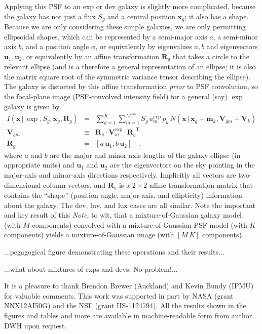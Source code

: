 \documentclass[12pt,pdftex,preprint]{aastex}
\newcommand{\documentname}{\textsl{Note}}
\newcommand{\tmatrix}[1]{\boldsymbol{#1}}
\newcommand{\transpose}[1]{{#1}^{\mathsf T}}
\newcommand{\tvector}[1]{\boldsymbol{#1}}
\newcommand{\pos}{\tvector{x}}
\newcommand{\mean}{\tvector{m}}
\newcommand{\var}{\tmatrix{V}}
\newcommand{\affine}{\tmatrix{R}}
\newcommand{\uv}{\tvector{u}}
\newcommand{\normal}{N}
\newcommand{\given}{\,|\,}
\newcommand{\dev}{\mathrm{dev}}
\newcommand{\lux}{\mathrm{lux}}
\newcommand{\luv}{\mathrm{luv}}
\begin{document}
Applying this PSF to an exp or dev galaxy is slightly more
complicated, because the galaxy has not just a flux $S_g$ and a
central position $\pos_g$; it also has a shape.  Because we are only
considering these simple galaxies, we are only permitting ellipsoidal
shapes, which can be represented by a semi-major axis $a$, a
semi-minor axis $b$, and a position angle $\phi$, or equivalently by
eigenvalues $a, b$ and eigenvectors $\uv_1, \uv_2$, or equivalently by
an affine transformation $\affine_g$ that takes a circle to the
relevant ellipse (and is a therefore a general representation of an
ellipse; it is also the matrix square root of the symmetric variance
tensor describing the ellipse).  The galaxy is distorted by this
affine transformation \emph{prior} to PSF convolution, so the
focal-plane image (PSF-convolved intensity field) for a general (say)
$\exp$ galaxy is given by
\begin{eqnarray}\displaystyle
I(\pos\given\exp,S_g,\pos_g,\affine_g) &=& \sum_{k=1}^K \sum_{m=1}^{M^{\exp}} S_g\,a^{\exp}_m\,p_k\,\normal(\pos\given\pos_g+\mean_k,\var_{gm}+\var_k)
\\
\var_{gm} &\equiv& \affine_g\cdot\var^{\exp}_m\cdot\transpose{\affine_g}
\\
\affine_g &=& \left[a\,\uv_1 , b\,\uv_2 \right]
\quad ,
\end{eqnarray}
where $a$ and $b$ are the major and minor axis lengths of the galaxy
ellipse (in appropriate units) and $\uv_1$ and $\uv_2$ are the
eigenvectors on the sky pointing in the major-axis and minor-axis
directions respectively.  Implicitly all vectors are two-dimensional
column vectors, and $\affine_g$ is a $2\times 2$ affine transformation
matrix that contains the ``shape'' (position angle, major-axis, and
ellipticity) information about the galaxy.  The $\dev$, $\luv$, and
$\lux$ cases are all similar.  Note the important and key result of
this \documentname, to wit, that a mixture-of-Gaussian galaxy model
(with $M$ components) convolved with a mixture-of-Gaussian PSF model
(with $K$ components) yields a mixture-of-Gaussian image (with
$[M\,K]$ components).

...pegagogical figure demonstrating these operations and their results...

...what about mixtures of exps and devs:  No problem!...

\acknowledgements It is a pleasure to thank
      Brendon Brewer (Auckland)
  and Kevin Bundy (IPMU)
for valuable comments.  This work was supported in part by NASA (grant
NNX12AI50G) and the NSF (grant IIS-1124794).  All the results shown in
the figures and tables and more are available in machine-readable form
from author DWH upon request.
\end{document}
